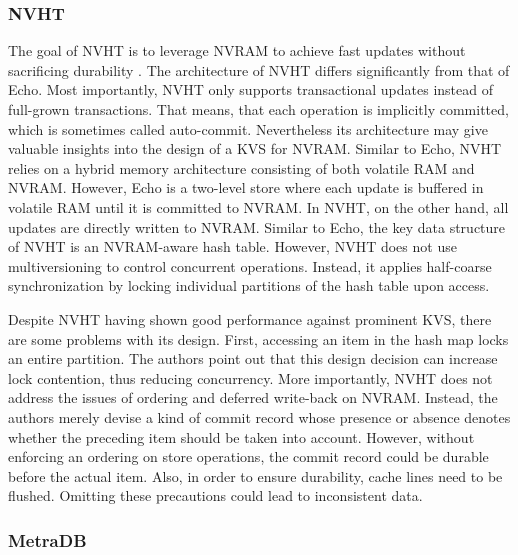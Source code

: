 \subsubsection{NVHT}

The goal of NVHT is to leverage \ac{NVRAM} to achieve fast updates without
sacrificing durability \cite{zhou2016nvht}. The architecture of NVHT differs
significantly from that of Echo. Most importantly, NVHT only supports
transactional updates instead of full-grown transactions. That means, that each
operation is implicitly committed, which is sometimes called auto-commit.
Nevertheless its architecture may give valuable insights into the design of a
\ac{KVS} for \ac{NVRAM}. Similar to Echo, NVHT relies on a hybrid memory architecture
consisting of both volatile \ac{RAM} and \ac{NVRAM}. However, Echo is a two-level store
where each update is buffered in volatile \ac{RAM} until it is committed to \ac{NVRAM}. In
NVHT, on the other hand, all updates are directly written to \ac{NVRAM}. Similar to
Echo, the key data structure of NVHT is an \ac{NVRAM}-aware hash table. However, NVHT
does not use multiversioning to control concurrent operations. Instead, it
applies half-coarse synchronization by locking individual partitions of the hash
table upon access.

Despite NVHT having shown good performance against prominent \ac{KVS}, there are some
problems with its design. First, accessing an item in the hash map locks an
entire partition. The authors point out that this design decision can increase
lock contention, thus reducing concurrency. More importantly, NVHT does not
address the issues of ordering and deferred write-back on \ac{NVRAM}. Instead, the
authors merely devise a kind of commit record whose presence or absence denotes
whether the preceding item should be taken into account. However, without
enforcing an ordering on store operations, the commit record could be durable
before the actual item. Also, in order to ensure durability, cache lines need to
be flushed. Omitting these precautions could lead to inconsistent data.

\subsubsection{MetraDB}

